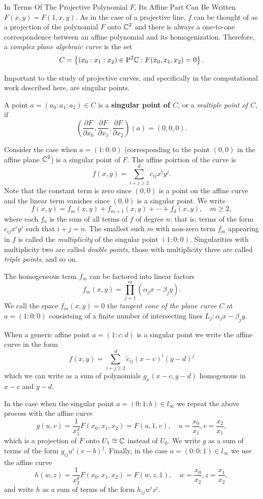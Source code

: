 In Terms Of The Projective Polynomial $F$, Its Affine Part Can Be Written
$F(x,y) = F(1,x,y)$. As in the case of a projective line, $f$ can be thought of
as a projection of the polynomial $F$ onto $\operatorname{\mathbb{C}}^2$ and there is always a
one-to-one correspondence between an affine polynomial and its homogenization.
Therefore, a {\it complex plane algebraic curve} is the set
\[
  C = \left\{ (x_0 : x_1 : x_2) \in \mathrm{P}^2 \!\operatorname{\mathbb{C}} : F(x_0,x_1,x_2) = 0 \right\}.
\]

Important to the study of projective curves, and specifically in the
computational work described here, are singular points.
\begin{definition} \label{def: singular-point} A point $a = (a_0 : a_1 : a_2)
  \in C$ is a {\bf singular point of $C$}, or a {\it multiple point of $C$}, if
  \[
    \left( \frac{\partial F}{\partial x_0},
      \frac{\partial F}{\partial x_1},
      \frac{\partial F}{\partial x_2} \right) (a) = (0,0,0).
  \]
\end{definition}
Consider the case when $a = (1 : 0 : 0)$ (corresponding to the point $(0,0)$ in
the affine plane $\operatorname{\mathbb{C}}^2$) is a singular point of $F$. The affine poirtion of the
curve is
\[
  f(x,y) = \sum_{i+j \geq 2}^d c_{ij} x^iy^j.
\]
Note that the constant term is zero since $(0, 0)$ is a point on the affine
curve and the linear term vanishes since $(0,0)$ is a singular point. We write
\[
  f(x,y) = f_m(x,y) + f_{m+1}(x,y) + \cdots + f_d(x,y), \quad m \geq 2,
\]
where each $f_n$ is the sum of all terms of $f$ of degree $n$; that is, terms of
the form $c_{ij}x^iy^j$ such that $i+j=n$. The smallest such $m$ with non-zero
term $f_m$ appearing in $f$ is called the {\it multiplicity} of the singular
point $(1 : 0 : 0)$. Singularities with multiplicity two are called {\it double
  points}, those with multiplicity three are called {\it triple points}, and so
on.

The homogeneous term $f_m$ can be factored into linear factors
\[
  f_m(x,y) = \prod_{j=1}^m (\alpha_j x - \beta_j y).
\]
We call the space $f_m(x,y) = 0$ the {\it tangent cone of the plane curve $C$}
at $a = (1 : 0 : 0)$ consistsing of a finite number of intersecting lines $L_j :
\alpha_j x - \beta_j y$.

When a generic affine point $a = (1 : c : d)$ is a singular point we write the
affine curve in the form
\[
  f(x,y) = \sum_{i+j \geq 2}^d \tilde{c}_{ij} (x-c)^i(y-d)^j
\]
which we can write as a sum of polynomials $g_n(x-c,y-d)$ homogenous in $x-c$
and $y-d$.

In the case when the singular point $a = (0 : 1 : b) \in l_\infty$ we repeat the
above process with the affine curve
\[
  g(u,v) = \frac{1}{x_1^d} F(x_0, x_1, x_2) = F(u,1,v), \quad u =
  \frac{x_0}{x_1}, v = \frac{x_2}{x_1},
\]
which is a projection of $F$ onto $U_1 \cong \operatorname{\mathbb{C}}$ instead of $U_0$. We write $g$
as a sum of terms of the form $g_{ij}u^i(v-b)^j$. Finally, in the case $a = (0 :
0 : 1) \in l_\infty$ we use the affine curve
\[
  h(w,z) = \frac{1}{x_2^d} F(x_0, x_1, x_2) = F(w,z,1), \quad w =
  \frac{x_0}{x_2}, z = \frac{x_1}{x_2},
\]
and write $h$ as a sum of terms of the form $h_{ij}w^iz^j$.

